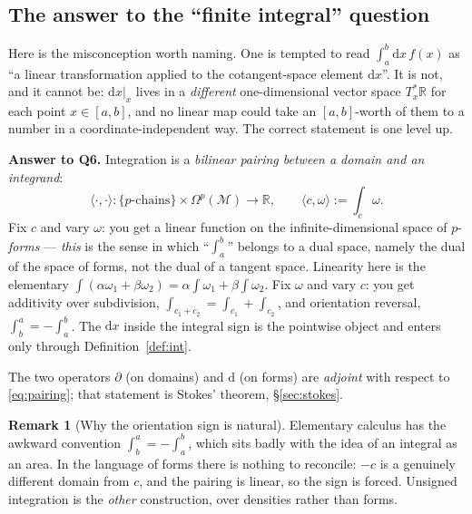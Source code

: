 \documentclass[10pt,a4paper]{article}
\newcommand{\dd}{\mathrm{d}}
\newcommand{\R}{\mathbb{R}}
\newcommand{\M}{\mathcal{M}}
\newcommand{\Om}{\Omega}
\newcommand{\pair}[2]{\langle #1 , #2 \rangle}
\theoremstyle{plain}
\theoremstyle{definition}
\newtheorem{rmk}[thm]{Remark}
\numberwithin{equation}{section}
\begin{document}
\subsection{The answer to the ``finite integral'' question}

Here is the misconception worth naming. One is tempted to read $\int_a^b\dd x\,f(x)$ as ``a
linear transformation applied to the cotangent-space element $\dd x$''. It is not, and it cannot
be: $\dd x|_x$ lives in a \emph{different} one-dimensional vector space $T_x^*\R$ for each point
$x\in[a,b]$, and no linear map could take an $[a,b]$-worth of them to a number in a
coordinate-independent way. The correct statement is one level up.

\begin{keybox}
\textbf{Answer to Q6.} Integration is a \emph{bilinear pairing between a domain and an
integrand}:
\begin{equation}
\pair{\cdot}{\cdot}: \{p\text{-chains}\}\times\Om^p(\M)\to\R,
\qquad \pair{c}{\omega}:=\int_c\omega .
\label{eq:pairing}
\end{equation}
Fix $c$ and vary $\omega$: you get a linear function on the infinite-dimensional space of
$p$-\emph{forms} --- \emph{this} is the sense in which ``$\int_a^b$'' belongs to a dual space,
namely the dual of the space of forms, not the dual of a tangent space. Linearity here is the
elementary $\int(\alpha\omega_1+\beta\omega_2)=\alpha\int\omega_1+\beta\int\omega_2$. Fix
$\omega$ and vary $c$: you get additivity over subdivision, $\int_{c_1+c_2}=\int_{c_1}+\int_{c_2}$,
and orientation reversal, $\int_b^a=-\int_a^b$. The $\dd x$ inside the integral sign is the
pointwise object and enters only through Definition~\ref{def:int}.
\end{keybox}

\noindent The two operators $\partial$ (on domains) and $\dd$ (on forms) are \emph{adjoint} with
respect to \eqref{eq:pairing}; that statement is Stokes' theorem, \S\ref{sec:stokes}.

\begin{rmk}[Why the orientation sign is natural]
Elementary calculus has the awkward convention $\int_b^a=-\int_a^b$, which sits badly with the
idea of an integral as an area. In the language of forms there is nothing to reconcile: $-c$ is
a genuinely different domain from $c$, and the pairing is linear, so the sign is forced.
Unsigned integration is the \emph{other} construction, over densities rather than forms.
\end{rmk}
\end{document}
